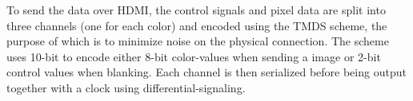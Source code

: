 \documentclass[../main/report.tex]{subfiles}
\begin{document}
To send the data over HDMI, the control signals and pixel data are split into three channels (one for each color) and encoded using the TMDS scheme, the purpose of which is to minimize noise on the physical connection.
The scheme uses 10-bit to encode either 8-bit color-values when sending a image or 2-bit control values when blanking.
Each channel is then serialized before being output together with a clock using differential-signaling.
\end{document}

